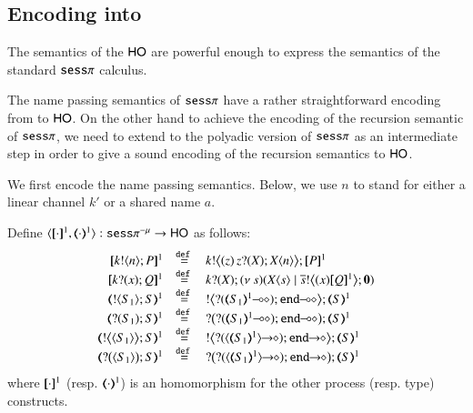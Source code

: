 \subsection{Encoding \sespnr  into \HO}

The semantics of the $\mathsf{HO}$ are powerful enough to
express the semantics of the standard $\mathtt{sess}\pi$ calculus.

The name passing semantics of $\mathtt{sess}\pi$ have a rather straightforward
encoding from to $\mathsf{HO}$.
On the other hand to achieve the encoding of the recursion semantic
of $\mathtt{sess}\pi$, we need to extend
to the polyadic version of $\mathtt{sess}\pi$ as an intermediate step in order
to give a sound encoding of the recursion semantics to $\mathsf{HO}$.

We first encode the name passing semantics. Below, we use $n$ to stand for either a linear channel $k'$ or a shared name $a$.

\begin{definition}
    Define $\encod{\cdot}{\cdot}{1}: \sespnr \to \HO$  as follows:
\[
	\begin{array}{rcl}
		\pmap{\bout{k}{n} P}{1}	&\defeq&	\bbout{k}{ \abs{z}{\,\binp{z}{X} \appl{X}{n}} } \pmap{P}{1} \\
		\pmap{\binp{k}{x} Q}{1}	&\defeq&	\binp{k}{X} \newsp{s}{\appl{X}{s} \Par \bbout{\dual{s}}{\abs{x} \pmap{Q}{1}} \inact} \\
		\tmap{\btout{S_1} {S} }{1}	&\defeq&	\bbtout{\lhot{\btinp{\lhot{\tmap{S_1}{1}}}\tinact}} \tmap{S}{1}  \\
		\tmap{\btinp{S_1} S }{1}	&\defeq&	\bbtinp{\lhot{\btinp{\lhot{\tmap{S_1}{1}}}\tinact}} \tmap{S}{1} \\
		\tmap{\bbtout{\chtype{S_1}} {S} }{1}	&\defeq&	\bbtout{\shot{\btinp{\shot{\chtype{\tmap{S_1}{1}}}}\tinact}} \tmap{S}{1}  \\
		\tmap{\bbtinp{\chtype{S_1}} {S} }{1}	&\defeq&	\bbtinp{\shot{\btinp{\shot{\chtype{\tmap{S_1}{1}}}}\tinact}} \tmap{S}{1} 
	\end{array}
\]
where $[\!\![\cdot]\!\!]^1$ (resp. $(\!\!\langle\cdot\rangle\!\!)^1$) is an 
homomorphism for the other process (resp. type) constructs.
\end{definition}

